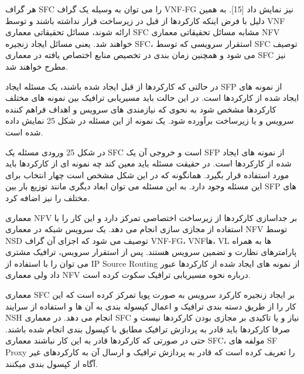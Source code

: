 \documentclass{book}
\begin{document}
هر گراف SFC را می توان به وسیله یک گراف VNF-FG نیز نمایش داد [15]. به همین دلیل با فرض اینکه کارکردها از قبل در زیرساخت قرار نداشته باشند و توسط VNF ارائه شوند، مسائل تحقیقاتی معماری SFC مشابه مسائل تحقیقاتی معماری NFV خواهند شد. یعنی مسائل ایجاد زنجیره SFC، استقرار سرویسی که توسط SFC توصیف می شود و همچنین زمان بندی در تخصیص منابع اختصاص یافته در معماری SFC نیز مطرح خواهند شد.

در حالتی که کارکردها از قبل ایجاد شده باشند، یک مسئله ایجاد SFP از نمونه های ایجاد شده از کارکردها است. در این حالت باید مسیریابی ترافیک بین نمونه های مختلف کارکردها مشخص شود به نحوی که نیازمندی های سرویس و اهداف فراهم کننده سرویس و یا زیرساخت برآورده شود. یک نمونه از این مسئله در شکل 25 نمایش داده شده است.

در شکل 25 ورودی مسئله یک SFC است و خروجی آن یک SFP از نمونه های ایجاد شده از کارکردها است. در حقیقت مسئله باید معین کند چه نمونه ای از کارکردها باید مورد استفاده قرار بگیرد. همانگونه که در این شکل مشخص است چهار انتخاب برای این مسئله وجود دارد. به این مسئله می توان ابعاد دیگری مانند توزیع بار بین SFP های مختلف را نیز اضافه کرد.


معماری NFV بر جداسازی کارکردها از زیرساخت اختصاصی تمرکز دارد و این کار را با استفاده از مجازی سازی انجام می دهد. یک سرویس شبکه در معماری NFV توسط NSD توصیف می شود که اجزای آن گراف VNF-FG، VNFها، VL ها به همراه پارامترهای نظارت و تضمین سرویس هستند. پس از استقرار سرویس، ترافیک مشتری می توان را با استفاده از IP Source Routing از نمونه های ایجاد شده از کارکردها عبور داد ولی معماری NFV درباره نحوه مسیریابی ترافیک سکوت کرده است.

معماری SFC بر ایجاد زنجیره کارکرد سرویس به صورت پویا تمرکز کرده است که این کار را از طریق دسته بندی ترافیک و اعمال کپسوله بندی به آن ها و استفاده از سرایند NSH انجام می دهد. در معماری SFC نیاز و یا تاکیدی بر مجازی بودن کارکردها نیست و صرفا کارکردها باید قادر به پردازش ترافیک مطابق با کپسول بندی انجام شده باشند. حتی در صورتی که کارکردها قادر به این کار نباشند معماری SFC، مولفه های SF Proxy را تعریف کرده است که قادر به پردازش ترافیک و ارسال آن به کارکردهای غیر آگاه از کپسول بندی میکنند.
\end{document}
